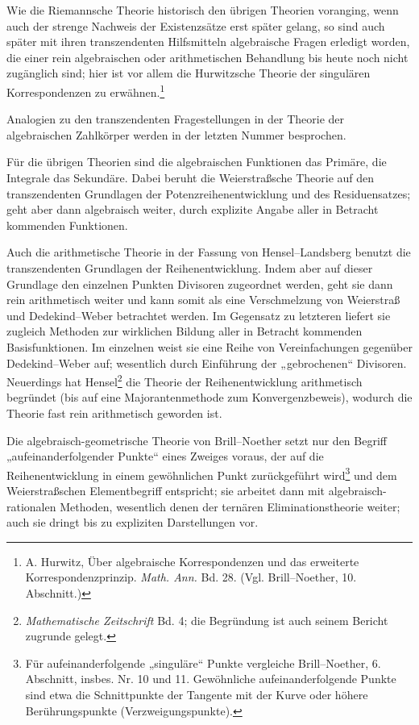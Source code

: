 \documentclass[11pt]{article}
\begin{document}
Wie die Riemannsche Theorie historisch den übrigen Theorien voranging, wenn auch der strenge Nachweis der Existenzsätze erst später gelang, so sind auch später mit ihren transzendenten Hilfsmitteln algebraische Fragen erledigt worden, die einer rein algebraischen oder arithmetischen Behandlung bis heute noch nicht zugänglich sind; hier ist vor allem die Hurwitzsche Theorie der singulären Korrespondenzen zu erwähnen.\footnote{A. Hurwitz, Über algebraische Korrespondenzen und das erweiterte Korrespondenzprinzip. \emph{Math. Ann.} Bd. 28. (Vgl. Brill--Noether, 10. Abschnitt.)}

Analogien zu den transzendenten Fragestellungen in der Theorie der algebraischen Zahlkörper werden in der letzten Nummer besprochen.

Für die übrigen Theorien sind die algebraischen Funktionen das Primäre, die Integrale das Sekundäre. Dabei beruht die Weierstraßsche Theorie auf den transzendenten Grundlagen der Potenzreihenentwicklung und des Residuensatzes; geht aber dann algebraisch weiter, durch explizite Angabe aller in Betracht kommenden Funktionen.

Auch die arithmetische Theorie in der Fassung von Hensel--Landsberg benutzt die transzendenten Grundlagen der Reihenentwicklung. Indem aber auf dieser Grundlage den einzelnen Punkten Divisoren zugeordnet werden, geht sie dann rein arithmetisch weiter und kann somit als eine Verschmelzung von Weierstraß und Dedekind--Weber betrachtet werden. Im Gegensatz zu letzteren liefert sie zugleich Methoden zur wirklichen Bildung aller in Betracht kommenden Basisfunktionen. Im einzelnen weist sie eine Reihe von Vereinfachungen gegenüber Dedekind--Weber auf; wesentlich durch Einführung der „gebrochenen“ Divisoren. Neuerdings hat Hensel\footnote{\emph{Mathematische Zeitschrift} Bd. 4; die Begründung ist auch seinem Bericht zugrunde gelegt.} die Theorie der Reihenentwicklung arithmetisch begründet (bis auf eine Majorantenmethode zum Konvergenzbeweis), wodurch die Theorie fast rein arithmetisch geworden ist.

Die algebraisch-geometrische Theorie von Brill--Noether setzt nur den Begriff „aufeinanderfolgender Punkte“ eines Zweiges voraus, der auf die Reihenentwicklung in einem gewöhnlichen Punkt zurückgeführt wird\footnote{Für aufeinanderfolgende „singuläre“ Punkte vergleiche Brill--Noether, 6. Abschnitt, insbes. Nr. 10 und 11. Gewöhnliche aufeinanderfolgende Punkte sind etwa die Schnittpunkte der Tangente mit der Kurve oder höhere Berührungspunkte (Verzweigungspunkte).} und dem Weierstraßschen Elementbegriff entspricht; sie arbeitet dann mit algebraisch-rationalen Methoden, wesentlich denen der ternären Eliminationstheorie weiter; auch sie dringt bis zu expliziten Darstellungen vor.
\end{document}
